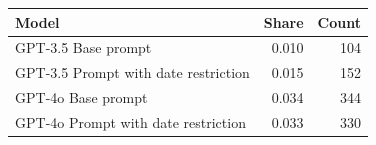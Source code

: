 
\begin{tabular}{lrr}
\toprule
Model & Share & Count\\
\midrule
GPT-3.5 Base prompt & 0.010 & 104\\
GPT-3.5 Prompt with date restriction & 0.015 & 152\\
\midrule
GPT-4o Base prompt & 0.034 & 344\\
GPT-4o Prompt with date restriction & 0.033 & 330\\
\bottomrule
\end{tabular}
